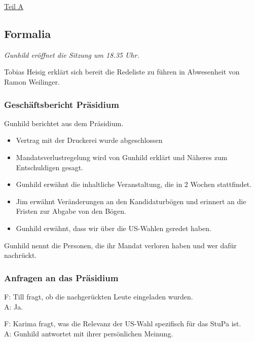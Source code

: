 \documentclass[ngerman,headheight=70pt]{scrartcl}
\begin{document}

    {\Large \underline{Teil A}}

    \subsection{Formalia}

    \textit{Gunhild eröffnet die Sitzung um 18.35 Uhr.}

    Tobias Heisig erklärt sich bereit die Redeliste zu führen in Abwesenheit
    von Ramon Weilinger.

    \subsubsection{Geschäftsbericht Präsidium}

    Gunhild berichtet aus dem Präsidium.

    \begin{itemize}
        \item Vertrag mit der Druckerei wurde abgeschlossen
        \item Mandatsverlustregelung wird von Gunhild erklärt und Näheres zum Entschuldigen
      gesagt.
        \item Gunhild erwähnt die inhaltliche Veranstaltung, die in 2 Wochen stattfindet.
        \item Jim erwähnt Veränderungen an den Kandidaturbögen und erinnert an die Fristen
      zur Abgabe von den Bögen.
        \item Gunhild erwähnt, dass wir über die US-Wahlen geredet haben.
    \end{itemize}

    Gunhild nennt die Personen, die ihr Mandat verloren haben und wer dafür nachrückt.

    \subsubsection{Anfragen an das Präsidium}

    F: Till fragt, ob die nachgerückten Leute eingeladen wurden. \\
    A: Ja.

    F: Karima fragt, was die Relevanz der US-Wahl spezifisch für das StuPa
    ist. \\
    A: Gunhild antwortet mit ihrer persönlichen Meinung.
\end{document}

